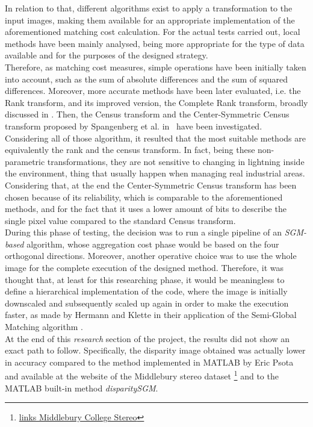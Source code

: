 In relation to that, different algorithms exist to apply a transformation to the input images, making them available for an appropriate implementation of the aforementioned matching cost calculation.
For the actual tests carried out, local methods have been mainly analysed, being more appropriate for the type of data available and for the purposes of the designed strategy.\\
Therefore, as matching cost measures, simple operations have been initially taken into account, such as the sum of absolute differences and the sum of squared differences. 
Moreover, more accurate methods have been later evaluated, i.e. the Rank transform, and its improved version, the Complete Rank transform, broadly discussed in \cite{Demetz2013}.
Then, the Census transform and the Center-Symmetric Census transform proposed by Spangenberg et al. in~\cite{Spangenberg2013} have been investigated.
Considering all of those algorithm, it resulted that the most suitable methods are equivalently the rank and the census transform.
In fact, being these non-parametric transformations, they are not sensitive to changing in lightning inside the environment, thing that usually happen when managing real industrial areas. 
Considering that, at the end the Center-Symmetric Census transform has been chosen because of its reliability, which is comparable to the aforementioned methods, and for the fact that it uses a lower amount of bits to describe the single pixel value compared to the standard Census transform.\\
During this phase of testing, the decision was to run a single pipeline of an \textit{SGM-based} algorithm, whose aggregation cost phase would be based on the four orthogonal directions. 
Moreover, another operative choice was to use the whole image for the complete execution of the designed method.
Therefore, it was thought that, at least for this researching phase, it would be meaningless to define a hierarchical implementation of the code, where the image is initially downscaled and subsequently scaled up again in order to make the execution faster, as made by Hermann and Klette in their application of the Semi-Global Matching algorithm \cite{Hermann2013}.\\
At the end of this \textit{research} section of the project, the results did not show an exact path to follow. 
Specifically, the disparity image obtained was actually lower in accuracy compared to the method implemented in MATLAB by Eric Psota and available at the website of the Middlebury stereo dataset \footnote{\href{http://vision.middlebury.edu/stereo/submit3}{links Middlebury College Stereo}} and to the MATLAB built-in method \textit{disparitySGM}. 
